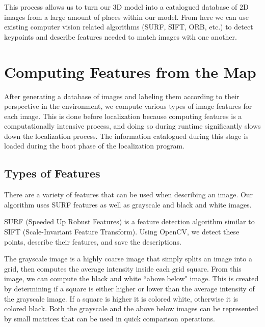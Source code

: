 \documentclass[a4paper,11pt]{article}
\begin{document}
  This process allows us to turn our 3D model into a catalogued database of 2D images from a large amount of places within our model. From here we can use existing computer vision related algorithms (SURF, SIFT, ORB, etc.) to detect keypoints and describe features needed to match images with one another.























  \section{Computing Features from the Map}
After generating a database of images and labeling them according to their perspective in the environment, we compute various types of image features for each image. This is done before localization because computing features is a computationally intensive process, and doing so during runtime significantly slows down the localization process. The information catalogued during this stage is loaded during the boot phase of the localization program.

  \subsection{Types of Features}
There are a variety of features that can be used when describing an image. Our algorithm uses SURF features as well as grayscale and black and white images.

SURF (Speeded Up Robust Features) is a feature detection algorithm similar to SIFT (Scale-Invariant Feature Transform). Using OpenCV, we detect these points, describe their features, and save the descriptions.

The grayscale image is a highly coarse image that simply splits an image into a grid, then computes the average intensity inside each grid square. From this image, we can compute the black and white ``above below" image. This is created by determining if a square is either higher or lower than the average intensity of the grayscale image. If a square is higher it is colored white, otherwise it is colored black. Both the grayscale and the above below images can be represented by small matrices that can be used in quick comparison operations.
\end{document}
